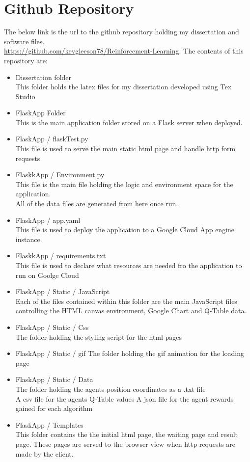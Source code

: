 \section{Github Repository}
The below link is the url to the github repository holding my dissertation and software files.\\
\href{https://github.com/kevgleeson78/Reinforcement-Learning}{https://github.com/kevgleeson78/Reinforcement-Learning}.
The contents of this repository are:
\begin{itemize}
	\item Dissertation folder\\
	This folder holds the latex files for my dissertation developed using Tex Studio
	\item FlaskApp Folder\\
	This is the main application folder stored on a Flask server when deployed.
	\item FlaskApp / flaskTest.py\\
	This file is used to serve the main static html page and handle http form requests 
	\item FlaskkApp / Environment.py\\
	This file is the main file holding the logic and environment space for the application.\\
	All of the data files are generated from here once run.
	\item FlaskApp / app.yaml\\
	This file is used to deploy the application to a Google Cloud App engine instance.
	\item FlaskkApp / requirements.txt\\
	This file is used to declare what resources are needed fro the application to run on Goolge Cloud
	\item FlaskApp / Static / JavaScript\\
	Each of the files contained within this folder are the main JavaScript files controlling the HTML canvas environment, Google Chart and Q-Table data.
	\item FlaskApp / Static / Css\\
	The folder holding the styling script for the html pages
	\item FlaskApp / Static / gif
	The folder holding the gif animation for the loading page
	\item FlaskApp / Static / Data \\
	The folder holding the agents position coordinates as a .txt file\\
	A csv file for the agents Q-Table values
	A json file for the agent rewards gained for each algorithm
	\item FlaskApp / Templates\\
	This folder contains the the initial html page, the waiting page and result page. These pages are served to the browser view when http requests are made by the client.
	
\end{itemize}


